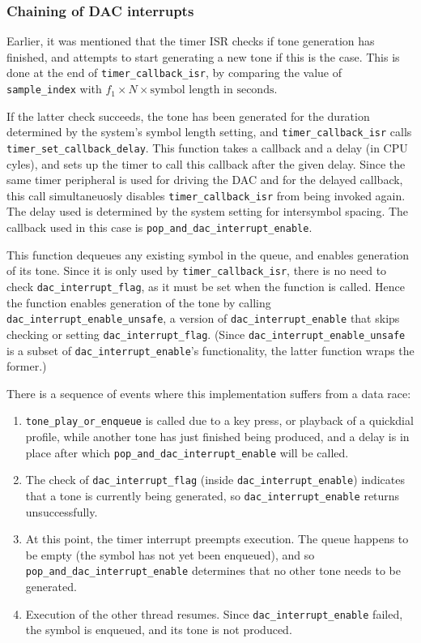 \documentclass[11pt,a4paper,twocolumn]{scrartcl}
\begin{document}
\subsubsection{Chaining of DAC interrupts}

Earlier, it was mentioned that the timer ISR checks if tone generation has finished, and attempts to start generating a new tone if this is the case. This is done at the end of \verb!timer_callback_isr!, by comparing the value of \verb!sample_index! with $f_1 \times N \times \text{symbol length in seconds}$.

If the latter check succeeds, the tone has been generated for the duration determined by the system's symbol length setting, and \verb!timer_callback_isr! calls \verb!timer_set_callback_delay!. This function takes a callback and a delay (in CPU cyles), and sets up the timer to call this callback after the given delay. Since the same timer peripheral is used for driving the DAC and for the delayed callback, this call simultaneuosly disables \verb!timer_callback_isr! from being invoked again. The delay used is determined by the system setting for intersymbol spacing. The callback used in this case is \verb!pop_and_dac_interrupt_enable!.

This function dequeues any existing symbol in the queue, and enables generation of its tone. Since it is only used by \verb!timer_callback_isr!, there is no need to check \verb!dac_interrupt_flag!, as it must be set when the function is called. Hence the function enables generation of the tone by calling \verb!dac_interrupt_enable_unsafe!, a version of \verb!dac_interrupt_enable! that skips checking or setting \verb!dac_interrupt_flag!. (Since \verb!dac_interrupt_enable_unsafe! is a subset of \verb!dac_interrupt_enable!'s functionality, the latter function wraps the former.) 

There is a sequence of events where this implementation suffers from a data race:
\begin{enumerate}
   \item \verb!tone_play_or_enqueue! is called due to a key press, or playback of a quickdial profile, while another tone has just finished being produced, and a delay is in place after which \verb!pop_and_dac_interrupt_enable! will be called.
   \item The check of \verb!dac_interrupt_flag! (inside \verb!dac_interrupt_enable!) indicates that a tone is currently being generated, so \verb!dac_interrupt_enable! returns unsuccessfully.
   \item At this point, the timer interrupt preempts execution. The queue happens to be empty (the symbol has not yet been enqueued), and so \verb!pop_and_dac_interrupt_enable! determines that no other tone needs to be generated.
   \item Execution of the other thread resumes. Since \verb!dac_interrupt_enable! failed, the symbol is enqueued, and its tone is not produced. 
\end{enumerate}
\end{document}

